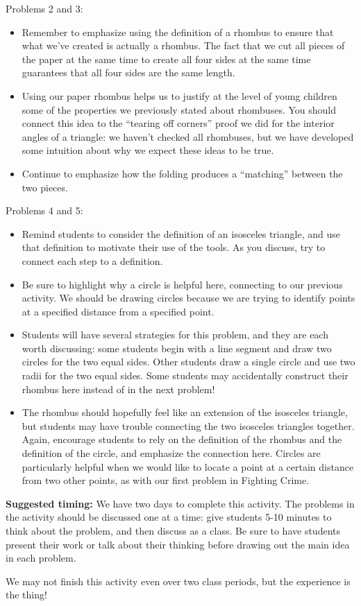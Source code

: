 \documentclass[noauthor, nooutcomes,handout]{ximera}
\begin{document}
\begin{instructorNotes}
Problems 2 and 3:
\begin{itemize}
	\item Remember to emphasize using the definition of a rhombus to ensure that what we've created is actually a rhombus. The fact that we cut all pieces of the paper at the same time to create all four sides at the same time guarantees that all four sides are the same length.
	\item Using our paper rhombus helps us to justify at the level of young children some of the properties we previously stated about rhombuses. You should connect this idea to the ``tearing off corners'' proof we did for the interior angles of a triangle: we haven't checked all rhombuses, but we have developed some intuition about why we expect these ideas to be true.
	\item Continue to emphasize how the folding produces a ``matching'' between the two pieces. 
\end{itemize}

Problems 4 and 5:
\begin{itemize}
	\item Remind students to consider the definition of an isosceles triangle, and use that definition to motivate their use of the tools. As you discuss, try to connect each step to a definition.
	\item Be sure to highlight why a circle is helpful here, connecting to our previous activity. We should be drawing circles because we are trying to identify points at a specified distance from a specified point.
	\item Students will have several strategies for this problem, and they are each worth discussing: some students begin with a line segment and draw two circles for the two equal sides. Other students draw a single circle and use two radii for the two equal sides. Some students may accidentally construct their rhombus here instead of in the next problem!
	\item The rhombus should hopefully feel like an extension of the isosceles triangle, but students may have trouble connecting the two isosceles triangles together. Again, encourage students to rely on the definition of the rhombus and the definition of the circle, and emphasize the connection here. Circles are particularly helpful when we would like to locate a point at a certain distance from two other points, as with our first problem in Fighting Crime.
\end{itemize}


{\bf Suggested timing:} We have two days to complete this activity. The problems in the activity should be discussed one at a time: give students 5-10 minutes to think about the problem, and then discuss as a class. Be sure to have students present their work or talk about their thinking before drawing out the main idea in each problem. 

We may not finish this activity even over two class periods, but the experience is the thing!
\end{instructorNotes}
\end{document}
